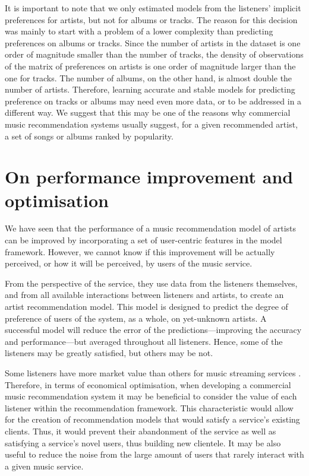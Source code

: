 It is important to note that we only estimated models from the listeners' implicit prefer\-ences for artists, but not for albums or tracks. The reason for this decision was mainly to start with a problem of a lower complexity than predicting preferences on albums or tracks. 
Since the number of artists in the dataset is one order of magnitude smaller than the number of tracks,
the density of observations of the matrix of preferences on artists is one order of magnitude larger than the one for tracks. 
The number of albums, on the other hand, is almost double the number of artists. 
Therefore, learning accurate and stable models for predicting preference on tracks or albums may need even more data, or to be addressed in a different way. 
We suggest that this may be one of the reasons why commercial music recommendation systems usually suggest, for a given recommended artist, a set of songs or albums ranked by popularity.



\section{On performance improvement and optimisation}\label{sec:conc_performance}
We have seen that the performance of a music recommendation model of artists can be improved by incorporating a set of user-centric features in the model framework. However, we cannot know if this improvement will be actually perceived, or how it will be perceived, by users of the music service. 

From the perspective of the service, they use data from the listeners themselves, and from all available interactions between listeners and artists, to create an artist recommendation model. 
This model is designed to predict the degree of preference of users of the system, as a whole, on yet-unknown artists.
A successful model will reduce the error of the predictions---improving the accuracy and performance---but averaged throughout all listeners.
Hence, some of the listeners may be greatly satisfied, but others may be not.

Some listeners have more market value than others for music streaming services \autocite{echonest13how}. Therefore, in terms of economical optimisation, when developing a commercial music recommendation system it may be beneficial to consider the value of each listener within the recommendation framework.
This characteristic would allow for the creation of recommendation models that would satisfy a service's existing clients. Thus, it would prevent their abandonment of the service as well as satisfying a service's novel users, thus building new clientele. It may be also useful to reduce the noise from the large amount of users that rarely interact with a given music service.

